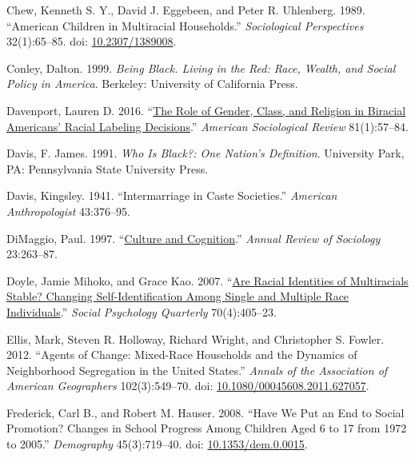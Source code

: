 \documentclass[
  letterpaper,
  DIV=11,
  numbers=noendperiod]{scrartcl}
\newlength{\cslhangindent}
\newlength{\cslentryspacingunit} %
\newenvironment{CSLReferences}[2] %
 {%
  \setlength{\parindent}{0pt}
  \ifodd #1
  \let\oldpar\par
  \def\par{\hangindent=\cslhangindent\oldpar}
  \fi
  \setlength{\parskip}{#2\cslentryspacingunit}
 }%
 {}
\begin{document}
\begin{CSLReferences}{1}{0}
\leavevmode{}%
Chew, Kenneth S. Y., David J. Eggebeen, and Peter R. Uhlenberg. 1989.
{``American {Children} in {Multiracial Households}.''}
\emph{Sociological Perspectives} 32(1):65--85. doi:
\href{https://doi.org/10.2307/1389008}{10.2307/1389008}.

\leavevmode{}%
Conley, Dalton. 1999. \emph{Being {Black}. {Living} in the {Red}:
{Race}, {Wealth}, and {Social Policy} in {America}}. {Berkeley}:
{University of California Press}.

\leavevmode{}%
Davenport, Lauren D. 2016.
{``\href{http://asr.sagepub.com/content/81/1/57.short}{The {Role} of
{Gender}, {Class}, and {Religion} in {Biracial Americans}' {Racial
Labeling Decisions}}.''} \emph{American Sociological Review}
81(1):57--84.

\leavevmode{}%
Davis, F. James. 1991. \emph{Who Is {Black}?: {One Nation}'s
{Definition}}. {University Park, PA}: {Pennsylvania State University
Press}.

\leavevmode{}%
Davis, Kingsley. 1941. {``Intermarriage in {Caste Societies}.''}
\emph{American Anthropologist} 43:376--95.

\leavevmode{}%
DiMaggio, Paul. 1997.
{``\href{http://www.jstor.org/stable/2952552}{Culture and
{Cognition}}.''} \emph{Annual Review of Sociology} 23:263--87.

\leavevmode{}%
Doyle, Jamie Mihoko, and Grace Kao. 2007.
{``\href{http://www.jstor.org/stable/20141804}{Are {Racial Identities}
of {Multiracials Stable}? {Changing Self-Identification} Among {Single}
and {Multiple Race Individuals}}.''} \emph{Social Psychology Quarterly}
70(4):405--23.

\leavevmode{}%
Ellis, Mark, Steven R. Holloway, Richard Wright, and Christopher S.
Fowler. 2012. {``Agents of {Change}: {Mixed-Race Households} and the
{Dynamics} of {Neighborhood Segregation} in the {United States}.''}
\emph{Annals of the Association of American Geographers} 102(3):549--70.
doi:
\href{https://doi.org/10.1080/00045608.2011.627057}{10.1080/00045608.2011.627057}.

\leavevmode{}%
Frederick, Carl B., and Robert M. Hauser. 2008. {``Have We Put an End to
Social Promotion? {Changes} in School Progress Among Children Aged 6 to
17 from 1972 to 2005.''} \emph{Demography} 45(3):719--40. doi:
\href{https://doi.org/10.1353/dem.0.0015}{10.1353/dem.0.0015}.


\end{CSLReferences}
\end{document}
